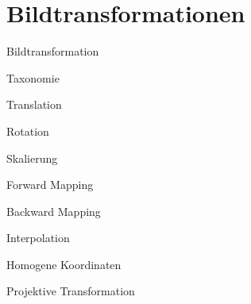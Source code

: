 \section{Bildtransformationen}

\begin{defi}{Bildtransformation}

\end{defi}

\begin{bonus}[Bildtransformation]{Taxonomie}

\end{bonus}

\begin{defi}[Bildtransformation]{Translation}

\end{defi}

\begin{defi}[Bildtransformation]{Rotation}

\end{defi}

\begin{defi}[Bildtransformation]{Skalierung}

\end{defi}

\begin{defi}[Bildtransformation]{Forward Mapping}

\end{defi}

\begin{defi}[Bildtransformation]{Backward Mapping}

\end{defi}

\begin{defi}[Bildtransformation]{Interpolation}

\end{defi}

\begin{defi}{Homogene Koordinaten}

\end{defi}

\begin{defi}[Bildtransformation]{Projektive Transformation}

\end{defi}
